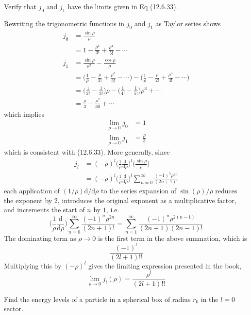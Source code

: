 \documentclass[../principles-of-quantum-mechanics.tex]{subfiles}
\begin{document}
\begin{questions}
		\question Verify that $j_0$ and $j_1$ have the limits given in Eq (12.6.33).
		
		\begin{solution}
			Rewriting the trigonometric functions in $j_0$ and $j_1$ as Taylor series shows
			\begin{align*}
				j_0 &= \frac{\sin\rho}{\rho} \\
				&= 1 - \frac{\rho^2}{3!} + \frac{\rho^4}{5!} - \cdots \\
				j_1 &= \frac{\sin\rho}{\rho^2} - \frac{\cos\rho}{\rho} \\
				&= 	\Big(\frac{1}{\rho} - \frac{\rho}{3!} + \frac{\rho^3}{5!} - \cdots\Big) - \Big(\frac{1}{\rho} - \frac{\rho}{2!} + \frac{\rho^3}{4!} - \cdots\Big) \\
				&= \Big(\frac{1}{2!} - \frac{1}{3!}\Big)\rho - \Big(\frac{1}{4!} - \frac{1}{5!}\Big)\rho^3 + \cdots \\
				&= \frac{\rho}{3} - \frac{\rho^2}{30} + \cdots
			\end{align*}
			which implies
			\begin{align*}
				\lim_{\rho\to 0}j_0 &= 1 \\
				\lim_{\rho\to 0}j_1 &= \frac{\rho}{3}
			\end{align*}
			which is consistent with (12.6.33). More generally, since
			\begin{align*}
				j_l &= (-\rho)^l\Big(\frac{1}{\rho}\frac{\mathrm{d}}{\mathrm{d}\rho}\Big)^l\Big(\frac{\sin\rho}{\rho}\Big) \\
				&= (-\rho)^l\Big(\frac{1}{\rho}\frac{\mathrm{d}}{\mathrm{d}\rho}\Big)^l\sum_{n=0}^\infty\frac{(-1)^{n}\rho^{2n}}{(2n + 1)!}
			\end{align*}
			each application of $(1/\rho)\mathrm{d}/\mathrm{d}\rho$ to the series expansion of $\sin(\rho)/\rho$ reduces the exponent by $2$, introduces the original exponent as a multiplicative factor, and increments the start of $n$ by $1$, i.e.
			$$\Big(\frac{1}{\rho}\frac{\mathrm{d}}{\mathrm{d}\rho}\Big)\sum_{n=0}^\infty\frac{(-1)^{n}\rho^{2n}}{(2n + 1)!} = \sum_{n=1}^{\infty}\frac{(-1)^n\rho^{2(n - 1)}}{(2n+1)(2n-1)!}$$
			The dominating term as $\rho\to0$ is the first term in the above summation, which is
			$$\frac{(-1)^l}{(2l + 1)!!}$$
			Multiplying this by $(-\rho)^l$ gives the limiting expression presented in the book,
			$$\lim_{\rho\to0}j_l(\rho) = \frac{\rho^l}{(2l + 1)!!}$$
		\end{solution}
		
		\question Find the energy levels of a particle in a spherical box of radius $r_0$ in the $l=0$ sector.
		

\end{questions}
\end{document}
